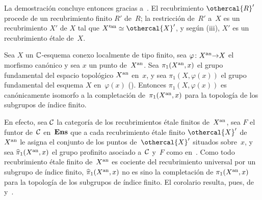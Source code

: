 La demostración concluye entonces gracias a~.
El recubrimiento $\othercal{R}'$ procede de un recubrimiento finito $R'$
de~$R$; la restricción de~$R'$ a~$X$ es un recubrimiento $X'$ de
$X$ tal que $X^{\prime\an}\simeq\othercal{X}'$, y según
(iii), $X'$ es un recubrimiento étale de~$X$.

\begin{corollaire}
\label{XII.5.2}
Sea
%
$X$ un $\CC$-esquema conexo localmente de tipo finito,
sea $\varphi\colon X^{\an}{\to}X$ el morfismo canónico y sea $x$ un
punto de~$X^{\an}$. Sea $\pi_1(X^{\an},x)$ el grupo fundamental del
espacio topológico $X^{\an}$ en~$x$, y sea $\pi_1(X,\varphi(x))$ el
grupo fundamental del esquema $X$ en~$\varphi(x)$
\textup{()}. Entonces $\pi_1(X,\varphi(x))$ es canónicamente
isomorfo a la completación de~$\pi_1(X^{\an},x)$ para la topología de los
subgrupos de índice finito.
\end{corollaire}

En efecto, sea $\cal{C}$ la categoría de los recubrimientos étale finitos
de~$X^{\an}$, sea $F$ el funtor de~$\cal{C}$ en~$\Ens$ que a cada
recubrimiento étale finito $\othercal{X}'$ de~$X^{\an}$ le asigna el
conjunto de los puntos de~$\othercal{X}'$ situados sobre~$x$, y sea
$\widehat{\pi}_1(X^{\an},x)$ el grupo profinito asociado a~$\cal{C}$ y~$F$
como en~. Como todo recubrimiento étale finito de~$X^{\an}$
es cociente del recubrimiento universal por un subgrupo de índice finito,
$\widehat{\pi}_1(X^{\an},x)$ no es sino la completación de
$\pi_1(X^{\an},x)$ para la topología de los subgrupos de índice finito.
El corolario resulta, pues, de~ y~.
